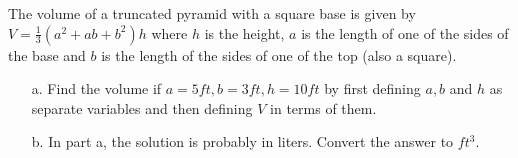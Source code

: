 {The volume of a truncated pyramid with a square base is given by $V=\frac{1}{3} (a^2 + ab +b^2)h$ where $h$ is the height, $a$ is the length of one of the sides of the base and $b$ is the length of the sides of one of the top (also a square).  
\begin{enumerate}
\item[a.] Find the volume if $a=5 ft, b=3ft, h=10 ft$ by first defining $a, b$ and $h$ as separate variables and then defining $V$ in terms of them.
\item[b.] In part a, the solution is probably in liters.  Convert the answer to $ft^3$.
\end{enumerate}
}
{}